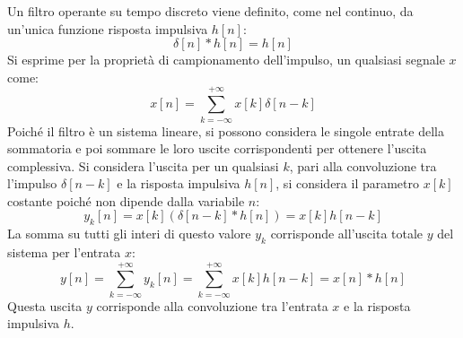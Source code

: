 \documentclass{article}
\numberwithin{equation}{subsection}
\begin{document}
Un filtro operante su tempo discreto viene definito, come nel continuo, da un'unica funzione risposta impulsiva $h[n]$:
\begin{equation*}
    \delta[n]*h[n]=h[n]
\end{equation*}
Si esprime per la proprietà di campionamento dell'impulso, un qualsiasi segnale $x$ come:
\begin{equation*}
    x[n]=\displaystyle\sum_{k=-\infty}^{+\infty}x[k]\delta[n-k]
\end{equation*}
Poiché il filtro è un sistema lineare, si possono considera le singole entrate della sommatoria e poi sommare le loro uscite corrispondenti per ottenere l'uscita complessiva. 
Si considera l'uscita per un qualsiasi $k$, pari alla convoluzione tra l'impulso $\delta[n-k]$ e la risposta impulsiva $h[n]$, si considera il parametro $x[k]$ costante poiché 
non dipende dalla variabile $n$:
\begin{equation*}
    y_k[n]=x[k](\delta[n-k]*h[n])=x[k]h[n-k]
\end{equation*}
La somma su tutti gli interi di questo valore $y_k$ corrisponde all'uscita totale $y$ del sistema per l'entrata $x$:
\begin{equation*}
    y[n]=\displaystyle\sum_{k=-\infty}^{+\infty}y_k[n]=\sum_{k=-\infty}^{+\infty}x[k]h[n-k]=x[n]*h[n]
\end{equation*}
Questa uscita $y$ corrisponde alla convoluzione tra l'entrata $x$ e la risposta impulsiva $h$. 
\end{document}
